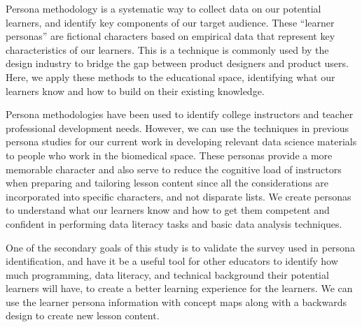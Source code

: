 \documentclass[020-persona\_validation.tex]{subfiles}
\begin{document}
    Persona methodology is a systematic way to collect data on our potential learners,
    and identify key components of our target audience.
    These ``learner personas'' are fictional characters based on empirical data that represent key characteristics
    of our learners.
    This is a technique is commonly used by the design industry to bridge the gap between product designers and product users.
    Here, we apply these methods to the educational space,
    identifying what our learners know and how to build on their existing knowledge.

    Persona methodologies have been used to identify
    college instructors and teacher professional development needs.
    However, we can use the techniques in previous persona studies
    for our current work in developing relevant data science materials to people who
    work in the biomedical space.
    These personas provide a more memorable character and also serve to reduce the cognitive load of instructors
    when preparing and tailoring lesson content since all the considerations are incorporated into specific characters,
    and not disparate lists.
    We create personas to understand what our learners know and how to get them competent and confident
    in performing data literacy tasks and basic data analysis techniques.


    One of the secondary goals of this study is to validate the survey used in persona identification,
    and have it be a useful tool for other educators to identify how much
    programming, data literacy, and technical background their potential learners will have,
    to create a better learning experience for the learners.
    We can use the learner persona information with concept maps along with a backwards design
    to create new lesson content.

\end{document}
